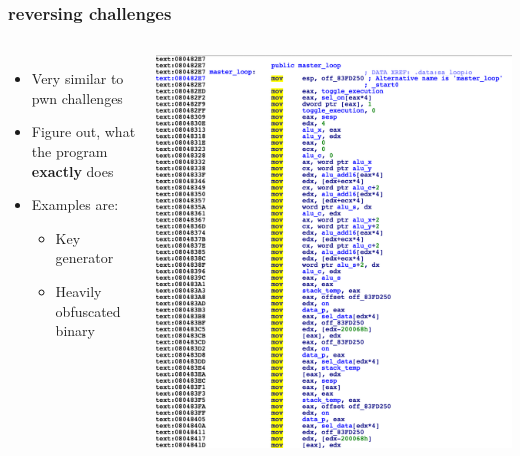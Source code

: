 \documentclass[aspectratio=169]{beamer}
\begin{document}
\begin{frame}
    \frametitle{reversing challenges}
    \begin{columns}
            \centering
            \begin{itemize}
                \item Very similar to pwn challenges
                \item Figure out, what the program {\textbf{exactly}} does
                \item Examples are:
                \begin{itemize}
                    \item Key generator
                    \item Heavily obfuscated binary
                \end{itemize}
            \end{itemize}
            \centering
            \includegraphics[width=\textwidth]{reversing_example.png}
    \end{columns}
\end{frame}
\end{document}
